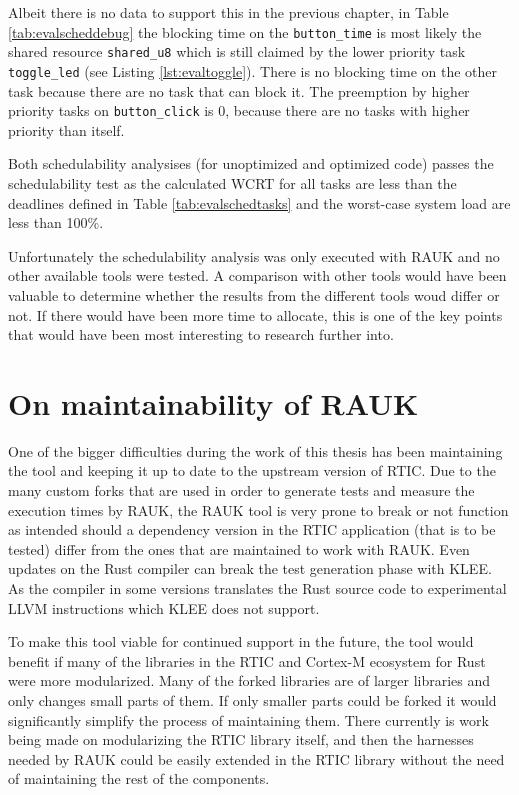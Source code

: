 Albeit there is no data to support this in the previous chapter, in Table
\ref{tab:evalscheddebug} the blocking time on the \texttt{button\_time} is most
likely the shared resource \texttt{shared\_u8} which is still claimed by the
lower priority task \texttt{toggle\_led} (see Listing \ref{lst:evaltoggle}).
There is no blocking time on the other task because there are no task that can
block it. The preemption by higher priority tasks on \texttt{button\_click} is
0, because there are no tasks with higher priority than itself.

Both schedulability analysises (for unoptimized and optimized code) passes the
schedulability test as the calculated WCRT for all tasks are less than
the deadlines defined in Table \ref{tab:evalschedtasks} and the worst-case
system load are less than 100\%.

Unfortunately the schedulability analysis was only executed with RAUK and no
other available tools were tested. A comparison with other tools would have
been valuable to determine whether the results from the different tools woud
differ or not. If there would have been more time to allocate, this is one of
the key points that would have been most interesting to research further into.

\section{On maintainability of RAUK}
One of the bigger difficulties during the work of this thesis has been
maintaining the tool and keeping it up to date to the upstream version of RTIC.
Due to the many custom forks that are used in order to generate tests and
measure the execution times by RAUK, the RAUK tool is very prone to break or
not function as intended should a dependency version in the RTIC application
(that is to be tested) differ from the ones that are maintained to work with
RAUK. Even updates on the Rust compiler can break the test generation phase
with KLEE. As the compiler in some versions translates the Rust source code to
experimental LLVM instructions which KLEE does not support.

To make this tool viable for continued support in the future, the tool would
benefit if many of the libraries in the RTIC and Cortex-M ecosystem for Rust
were more modularized. Many of the forked libraries are of larger libraries and
only changes small parts of them. If only smaller parts could be forked it
would significantly simplify the process of maintaining them. There currently
is work being made on modularizing the RTIC library itself, and then the
harnesses needed by RAUK could be easily extended in the RTIC library
without the need of maintaining the rest of the components.

